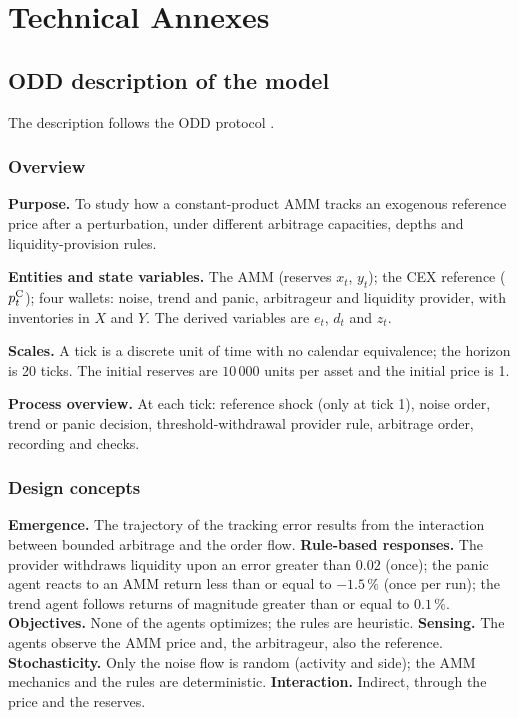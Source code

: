 \chapter{Technical Annexes}
\label{cap:anexos}

\section{ODD description of the model}
\label{sec:odd}

The description follows the ODD protocol \cite{grimm2020odd}.

\subsection*{Overview}

\textbf{Purpose.} To study how a constant-product AMM tracks an exogenous reference price after a perturbation, under different arbitrage capacities, depths and liquidity-provision rules.

\textbf{Entities and state variables.} The AMM (reserves $x_t$, $y_t$); the CEX reference ($p^{\mathrm{C}}_t$); four wallets: noise, trend and panic, arbitrageur and liquidity provider, with inventories in $X$ and $Y$. The derived variables are $e_t$, $d_t$ and $z_t$.

\textbf{Scales.} A tick is a discrete unit of time with no calendar equivalence; the horizon is 20 ticks. The initial reserves are $10\,000$ units per asset and the initial price is 1.

\textbf{Process overview.} At each tick: reference shock (only at tick 1), noise order, trend or panic decision, threshold-withdrawal provider rule, arbitrage order, recording and checks.

\subsection*{Design concepts}

\textbf{Emergence.} The trajectory of the tracking error results from the interaction between bounded arbitrage and the order flow. \textbf{Rule-based responses.} The provider withdraws liquidity upon an error greater than $0.02$ (once); the panic agent reacts to an AMM return less than or equal to $-1.5\,\%$ (once per run); the trend agent follows returns of magnitude greater than or equal to $0.1\,\%$. \textbf{Objectives.} None of the agents optimizes; the rules are heuristic. \textbf{Sensing.} The agents observe the AMM price and, the arbitrageur, also the reference. \textbf{Stochasticity.} Only the noise flow is random (activity and side); the AMM mechanics and the rules are deterministic. \textbf{Interaction.} Indirect, through the price and the reserves.

